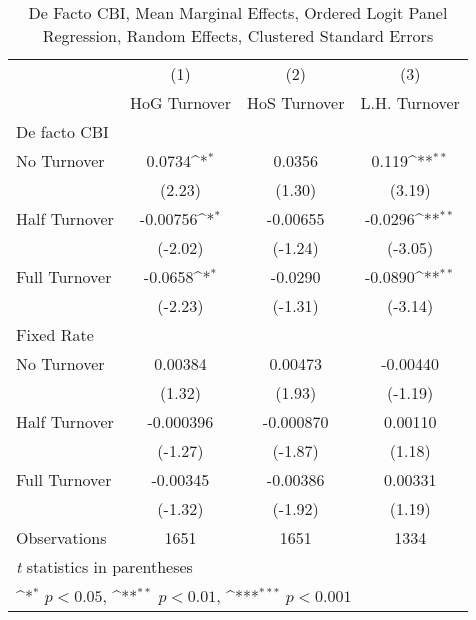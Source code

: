 \begin{table}[htbp]\centering
\def\sym#1{\ifmmode^{#1}\else\(^{#1}\)\fi}
\caption{De Facto CBI, Mean Marginal Effects, Ordered Logit Panel Regression, Random Effects, Clustered Standard Errors \label{ordLogDF}}
\begin{tabular}{l*{3}{c}}
\toprule
                                        &\multicolumn{1}{c}{(1)}&\multicolumn{1}{c}{(2)}&\multicolumn{1}{c}{(3)}\\
                                        &\multicolumn{1}{c}{HoG Turnover}&\multicolumn{1}{c}{HoS Turnover}&\multicolumn{1}{c}{L.H. Turnover}\\
\midrule
De facto CBI                            &                  &                  &                  \\
No Turnover                             &   0.0734\sym{*}  &   0.0356         &    0.119\sym{**} \\
                                        &   (2.23)         &   (1.30)         &   (3.19)         \\
\addlinespace
Half Turnover                           & -0.00756\sym{*}  & -0.00655         &  -0.0296\sym{**} \\
                                        &  (-2.02)         &  (-1.24)         &  (-3.05)         \\
\addlinespace
Full Turnover                           &  -0.0658\sym{*}  &  -0.0290         &  -0.0890\sym{**} \\
                                        &  (-2.23)         &  (-1.31)         &  (-3.14)         \\
\midrule
Fixed Rate                              &                  &                  &                  \\
No Turnover                             &  0.00384         &  0.00473         & -0.00440         \\
                                        &   (1.32)         &   (1.93)         &  (-1.19)         \\
\addlinespace
Half Turnover                           &-0.000396         &-0.000870         &  0.00110         \\
                                        &  (-1.27)         &  (-1.87)         &   (1.18)         \\
\addlinespace
Full Turnover                           & -0.00345         & -0.00386         &  0.00331         \\
                                        &  (-1.32)         &  (-1.92)         &   (1.19)         \\
\midrule
Observations                            &     1651         &     1651         &     1334         \\
\bottomrule
\multicolumn{4}{l}{\footnotesize \textit{t} statistics in parentheses}\\
\multicolumn{4}{l}{\footnotesize \sym{*} \(p<0.05\), \sym{**} \(p<0.01\), \sym{***} \(p<0.001\)}\\
\end{tabular}
\end{table}
